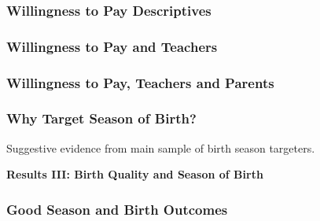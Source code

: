 \documentclass[10pt,letterpaper,subeqn]{beamer}
\begin{document}
\begin{frame}
  \frametitle{Willingness to Pay Descriptives}
    
\end{frame}

\begin{frame}
  \frametitle{Willingness to Pay and Teachers}
    
\end{frame}

\begin{frame}
  \frametitle{Willingness to Pay, Teachers and Parents}
    
\end{frame}

\begin{frame}
  \frametitle{Why Target Season of Birth?}
  Suggestive evidence from main sample of birth season targeters.
  
\end{frame}


\begin{frame}
  \begin{center}
    \textbf{Results III: Birth Quality and Season of Birth}
  \end{center}
\end{frame}


\begin{frame}
\frametitle{Good Season and Birth Outcomes}
    
\end{frame}






\end{document}
